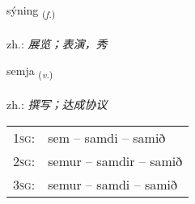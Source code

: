 \documentclass[frontgrid, backgrid]{flacards}\usepackage[]{graphicx}\usepackage[]{xcolor}
\begin{document}
\renewcommand{\flhead}{\vskip5pt \fboxsep=0pt {\small\bfseries\footnotesize Nafnorð | 名词}}
\renewcommand{\fcfoot}{\vskip5pt \fboxsep=0pt \hspace{2pt}{\small\bfseries\footnotesize 1K}}

\renewcommand{\blhead}{\vskip5pt {\small\bfseries\footnotesize Nafnorð | 名词 }}
\renewcommand{\bcfoot}{\vskip5pt \hspace{2pt}{\small\bfseries\footnotesize 1K}}


{sýning \small{\textsubscript{(\textit{f.})}} \\[1ex] %
\textphonetic{[siːniŋk]} \\
zh.: \emph{展览；表演，秀} \\  [2ex]
\renewcommand*{\arraystretch}{0.8}
}

\renewcommand{\flhead}{\vskip5pt \fboxsep=0pt {\small\bfseries\footnotesize Sagnorð | 动词}}
\renewcommand{\fcfoot}{\vskip5pt \fboxsep=0pt \hspace{2pt}{\small\bfseries\footnotesize 1K}}

\renewcommand{\blhead}{\vskip5pt {\small\bfseries\footnotesize Sagnorð | 动词 }}
\renewcommand{\bcfoot}{\vskip5pt \hspace{2pt}{\small\bfseries\footnotesize 1K}}


{semja \small{\textsubscript{(\textit{v.})}} \\[1ex] %
\textphonetic{[sɛmja]} \\
zh.: \emph{撰写；达成协议} \\  [2ex]
\renewcommand*{\arraystretch}{0.8}
\begin{tabular}{p{1cm}l}
\textsc{1sg}: & sem -- samdi -- samið \\ 
\textsc{2sg}: & semur -- samdir -- samið \\ 
\textsc{3sg}: & semur -- samdi -- samið \\ 
\end{tabular}
}
\end{document}
